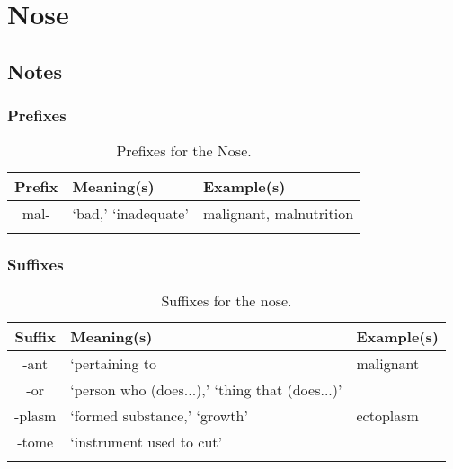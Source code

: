 %
%
%
\chapter{Nose}
\label{Nose} %








\abstract{}


\section{Notes}
\label{sec:NOTE7}


\subsection{Prefixes}

\begin{longtable}{c | p{} | p{}}
    \caption{Prefixes for the Nose.}
    \hline
    Prefix & Meaning(s) & Example(s) \\ \hline
        mal- & `bad,' `inadequate' & malignant, malnutrition \\
    \label{tab:Ch7Prefix}
\end{longtable}


\subsection{Suffixes}

\begin{longtable}{c | p{} | p{}}
    \caption{Suffixes for the nose.}
    \hline
    Suffix & Meaning(s) & Example(s) \\ \hline
        -ant & `pertaining to & malignant \\
        -or & `person who (does...),' `thing that (does...)' & \\
        -plasm & `formed substance,' `growth' & ectoplasm \\
        -tome & `instrument used to cut' & \\
    \label{tab:Ch7Suffix}
\end{longtable}


